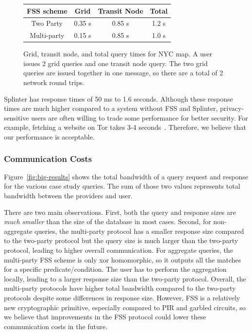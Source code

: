 \begin{figure}
	\centering
		\begin{tabular}{cccc}
			\toprule
			\bf FSS scheme & \bf Grid & \bf Transit Node & \bf Total \\
			\midrule
			Two Party & 0.35 s  & 0.85 s & 1.2 s \\
			Multi-party & 0.15 s & 0.85 s & 1.0 s \\
			\bottomrule
		\end{tabular}
	\caption[Grid, transit node, and total query times for NYC map.]
	{Grid, transit node, and total query times for NYC map. 
		A user issues 2 grid queries and one transit node query. The two grid queries
		are issued together in one message, so there are a total of 2 network round trips.}
	\label{fig:map-results}
\end{figure}

Splinter has response times of 50 ms to 1.6 seconds. Although these response times are
much higher compared to a system without FSS and Splinter, 
privacy-sensitive users are often willing
to trade some performance for better security. For
example, fetching a website on Tor 
takes 3-4 seconds~\cite{torStats}.
Therefore, we believe that our performance is 
acceptable.

\subsubsection{Communication Costs}
\label{sec:communication}
Figure~\ref{fig:big-results} shows the total bandwidth of a query request and response
for the various case study queries. The sum of those
two values represents total bandwidth between the providers and user.

There are two main observations. First, both the query and response sizes are \textit{much smaller} than the size
of the database in most cases. 
Second, for non-aggregate queries, the multi-party protocol has 
a smaller response size compared to the two-party protocol but the query size is much larger
than the two-party protocol, leading to higher overall communication. 
For aggregate queries, the multi-party FSS scheme is only xor homomorphic, so
it outputs all the matches for a specific predicate/condition. The user has to perform
the aggregation locally, leading to a larger response size than the two-party protocol.
Overall, the multi-party protocols have higher total bandwidth compared to the two-party protocols
despite some differences in response size. However, FSS is a relatively new cryptographic
primitive, especially compared to PIR and garbled circuits, so we believe that
improvements in the FSS protocol could lower these communication costs in the future.

